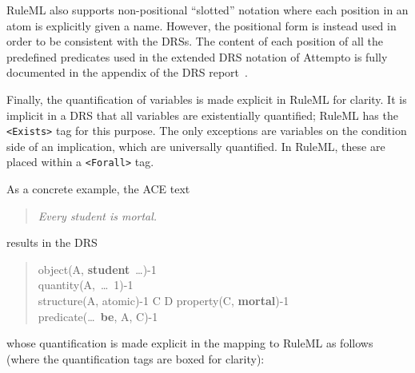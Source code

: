 \documentclass[12pt]{report}
\begin{document}
RuleML also supports non-positional ``slotted'' notation where each position in an atom is explicitly given a name. However, the positional form is instead used in order to be consistent with the DRSs. The content of each position of all the predefined predicates used in the extended DRS notation of Attempto is fully documented in the appendix of the DRS report~\cite{drs}.

Finally, the quantification of variables is made explicit in RuleML for clarity. It is implicit in a DRS that all variables are existentially quantified; RuleML has the \verb|<Exists>| tag for this purpose. The only exceptions are variables on the condition side of an implication, which are universally quantified. In RuleML, these are placed within a \verb|<Forall>| tag.

As a concrete example, the ACE text
\begin{quote}
\textit{Every student is mortal.}
\end{quote}
results in the DRS
\begin{quote}
\drs{~}
{
	{
	object(A, \textbf{student}~\ldots)-1\\
	quantity(A,~\ldots~1)-1\\
	structure(A, atomic)-1
	}
	{C D}
	{
	property(C, \textbf{mortal})-1\\
	predicate(\ldots~\textbf{be}, A, C)-1
	}
}
\end{quote}
whose quantification is made explicit in the mapping to RuleML as follows (where the quantification tags are boxed for clarity):
\end{document}
